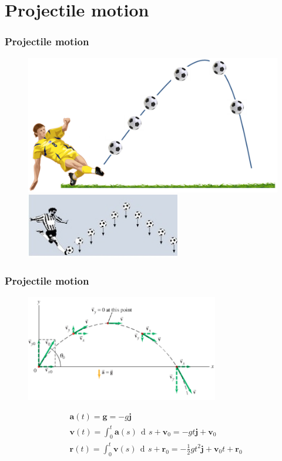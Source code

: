 \documentclass[10pt]{beamer}
\DeclareMathOperator{\xd}{\,d\!}
\begin{document}
\section{Projectile motion}
\begin{frame}
\frametitle{Projectile motion}
\begin{figure}
\includegraphics[width=.7\textwidth]{soccer1.png}\\[1em]\pause
\includegraphics[width=0.6\textwidth]{soccer2.jpg}
\end{figure}
\end{frame}

\begin{frame}
\frametitle{Projectile motion}
\centering
\begin{figure}
\includegraphics[width=0.75\textwidth]{projectile.png}
\end{figure}\pause
\begin{align*}
&\mathbf a(t)= \mathbf g =-g\mathbf j\\
&\mathbf v(t) = \int_0^t \mathbf a(s)\xd s + \mathbf v_0 = -gt\mathbf j + \mathbf v_0\\
&\mathbf r(t) = \int_0^t \mathbf v(s)\xd s + \mathbf r_0 = -\frac{1}{2}gt^2\mathbf j + \mathbf v_0t + \mathbf r_0
\end{align*}
\end{frame}
\end{document}

